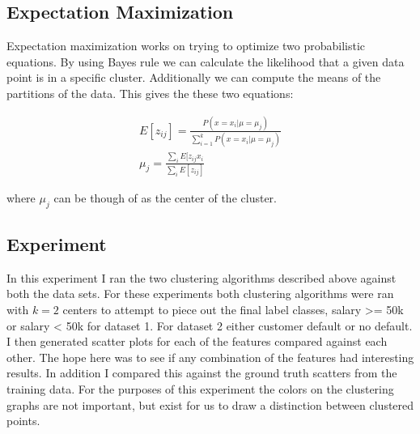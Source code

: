 \documentclass[
letterpaper, %
]{IEEEtran}
\begin{document}
	\subsection{Expectation Maximization}
	Expectation maximization works on trying to optimize two probabilistic equations. By using Bayes rule we can calculate the likelihood that a given data point is in a specific cluster. Additionally we can compute the means of the partitions of the data. This gives the these two equations:
	
	\begin{align}
		E[z_{ij}] = \frac{P(x=x_i | \mu = \mu_j)}{\sum_{i=1}^{k}P(x=x_i | \mu = \mu_j)} \\
		\mu_j = \frac{\sum_{i}E[z_{ij}x_i}{\sum_i E[z_{ij}]}
	\end{align}

	where $\mu_j$ can be though of as the center of the cluster.
	
	\subsection{Experiment}
	In this experiment I ran the two clustering algorithms described above against both the data sets. For these experiments both clustering algorithms were ran with $k=2$ centers to attempt to piece out the final label classes, salary >= 50k or salary < 50k for dataset 1. For dataset 2 either customer default or no default. I then generated scatter plots for each of the features compared against each other. The hope here was to see if any combination of the features had interesting results. In addition I compared this against the ground truth scatters from the training data. For the purposes of this experiment the colors on the clustering graphs are not important, but exist for us to draw a distinction between clustered points.
	
\end{document}
